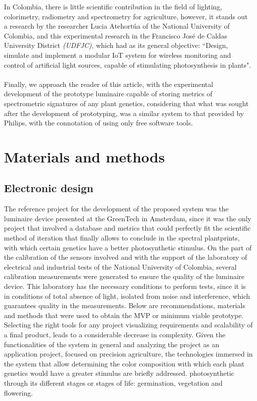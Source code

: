 \documentclass[letterpaper,12pt,twoside]{articleingud}
\begin{document}
In Colombia, there is little scientific contribution in the field of lighting, colorimetry, radiometry and spectrometry for agriculture, however, it stands out a research by the researcher Lucia Atehortúa of the National University of Colombia, and this experimental research in the Francisco José de Caldas University District \textit{(UDFJC)}, which had as its general objective: ``Design, simulate and implement a modular IoT system for wireless monitoring and control of artificial light sources, capable of stimulating photosynthesis in plants".\cite{UNAL}
\\\\
Finally, we approach the reader of this article, with the experimental development of the prototype luminaire capable of storing metrics of spectrometric signatures of any plant genetics, considering that what was sought after the development of prototyping, was a similar system to that provided by Philips, with the connotation of using only free software tools.
\section{Materials and methods}

\subsection{Electronic design}
The reference project for the development of the proposed system was the luminaire device presented at the GreenTech in Amsterdam, since it was the only project that involved a database and metrics that could perfectly fit the scientific method of iteration that finally allows to conclude in the spectral plantprints, with which certain genetics have a better photosynthetic stimulus.
On the part of the calibration of the sensors involved and with the support of the laboratory of electrical and industrial tests of the National University of Colombia, several calibration measurements were generated to ensure the quality of the luminaire device. This laboratory has the necessary conditions to perform tests, since it is in conditions of total absence of light, isolated from noise and interference, which guarantees quality in the measurements.
Below are recommendations, materials and methods that were used to obtain the MVP or minimum viable prototype.
Selecting the right tools for any project visualizing requirements and scalability of a final product, leads to a considerable decrease in complexity. Given the functionalities of the system in general and analyzing the project as an application project, focused on precision agriculture, the technologies immersed in the system that allow determining the color composition with which each plant genetics would have a greater stimulus are briefly addressed. photosynthetic through its different stages or stages of life: germination, vegetation and flowering.
\end{document}
